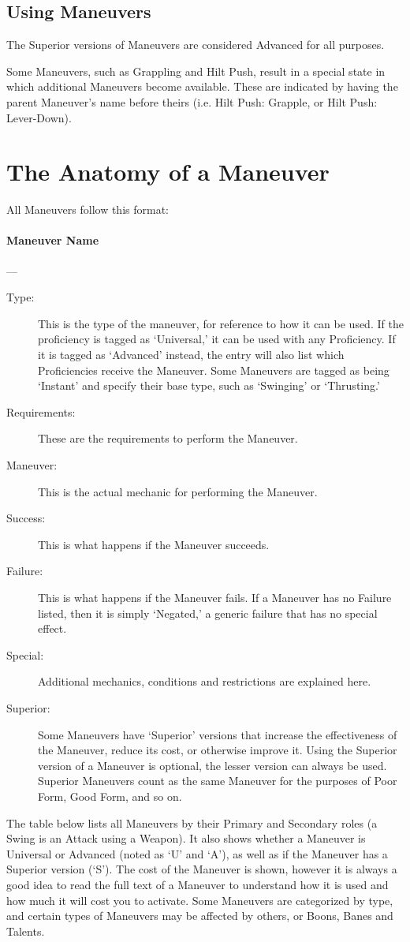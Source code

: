 \documentclass[oneside,11pt,english]{book}
\begin{document}
\subsection{Using Maneuvers}
The Superior versions of Maneuvers are considered Advanced for all purposes.

Some Maneuvers, such as Grappling and Hilt Push, result in a special state in which additional Maneuvers become available. These are indicated by having the parent Maneuver’s name before theirs (i.e. Hilt Push: Grapple, or Hilt Push: Lever-Down).

\section{\label{sec:Maneuvers}The Anatomy of a Maneuver}
All Maneuvers follow this format:


\paragraph{\large Maneuver Name}---
		\vspace{-10pt}\begin{description}
		\item [Type:] This is the type of the maneuver, for reference to how it can be used. If the proficiency is tagged as ‘Universal,’ it can be used with any Proficiency. If it is tagged as ‘Advanced’ instead, the entry will also list which Proficiencies receive the Maneuver. Some Maneuvers are tagged as being ‘Instant’ and specify their base type, such as ‘Swinging’ or ‘Thrusting.’
		\item [Requirements:] These are the requirements to perform the Maneuver.
		\item [Maneuver:] This is the actual mechanic for performing the Maneuver.
		\item [Success:] This is what happens if the Maneuver succeeds.
		\item [Failure:] This is what happens if the Maneuver fails. If a Maneuver has no Failure listed, then it is simply ‘Negated,’ a generic failure that has no special effect.
		\item [Special:] Additional mechanics, conditions and restrictions are explained here.
		\item [Superior:] Some Maneuvers have ‘Superior’ versions that increase the effectiveness of the Maneuver, reduce its cost, or otherwise improve it. Using the Superior version of a Maneuver is optional, the lesser version can always be used. Superior Maneuvers count as the same Maneuver for the purposes of Poor Form, Good Form, and so on.
\end{description}
The table below lists all Maneuvers by their Primary and Secondary roles (a Swing is an Attack using a 
Weapon). It also shows whether a Maneuver is Universal or Advanced (noted as ‘U’ and ‘A’), as well as 
if the Maneuver has a Superior version (‘S’). The cost of the Maneuver is shown, however it is always a 
good idea to read the full text of a Maneuver to understand how it is used and how much it will cost you 
to activate. Some Maneuvers are categorized by type, and certain types of Maneuvers may be affected by 
others, or Boons, Banes and Talents.
\end{document}

